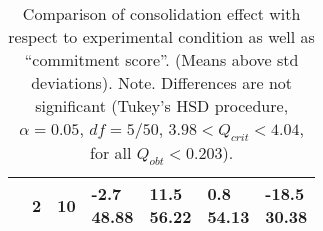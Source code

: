 \begin{table*}
\begin{tabularx}{\textwidth}{XXXXXXX}
      &
      2
      &
      10
      & \cellcontent{-2.7\\48.88}
      & \cellcontent{11.5\\56.22}
      & \cellcontent{0.8\\54.13}
      & \cellcontent{-18.5\\30.38}
      \\

      \bottomrule
    \end{tabularx}
    \endgroup
  \caption{Comparison of consolidation effect with respect to
    experimental condition as well as ``commitment score''. (Means
    above std deviations). Note. Differences are not significant
    (Tukey's HSD procedure, $\alpha=0.05$, $df = 5/50$,  $3.98 <
    Q_{crit} < 4.04$, for all $Q_{obt}<0.203$).\label{tab:commitment}}
\end{table*}



